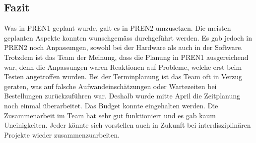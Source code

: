 \subsection{Fazit}
Was in PREN1 geplant wurde, galt es in PREN2 umzusetzen. Die meisten geplanten Aspekte konnten wunschgemäss durchgeführt werden. Es gab jedoch in PREN2 noch Anpassungen, sowohl  bei der Hardware als auch in der Software. Trotzdem ist das Team der Meinung, dass die Planung in PREN1 ausgereichend war, denn die Anpassungen waren Reaktionen auf Probleme, welche erst beim Testen angetroffen wurden. Bei der Terminplanung ist das Team oft in Verzug geraten, was auf falsche Aufwandeinschätzungen oder Wartezeiten bei Bestellungen zurückzuführen war. Deshalb wurde mitte April die Zeitplanung noch einmal überarbeitet. Das Budget konnte eingehalten werden. Die Zusammenarbeit im Team hat sehr gut funktioniert und es gab kaum Uneinigkeiten. Jeder könnte sich vorstellen auch in Zukunft bei interdisziplinären Projekte wieder zusammenzuarbeiten.